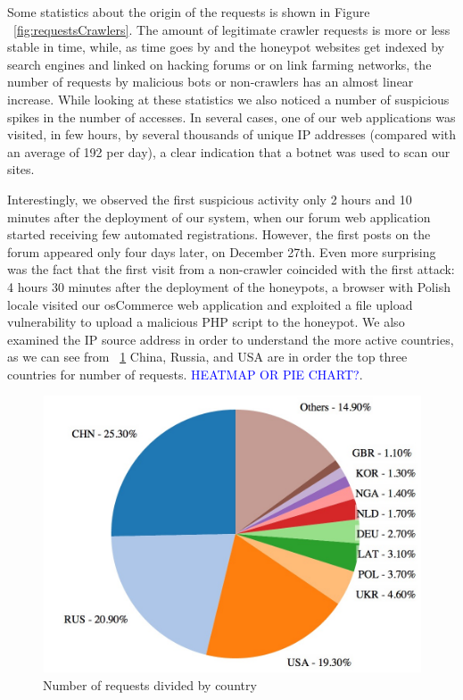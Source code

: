Some statistics about the origin of the requests is shown in Figure ~\ref{fig:requestsCrawlers}. The amount of legitimate crawler requests is more or less stable in time, while, as time goes by and the honeypot websites get indexed by search engines and linked on hacking forums or on link farming networks, the number of requests by malicious bots or non-crawlers has an almost linear increase.
While looking at these statistics we also noticed a number of suspicious spikes in the number of accesses. In several cases, one of our web applications was visited, in few hours, by several thousands of unique IP addresses (compared with an average of 192 per day), a clear indication that a botnet was used to scan our sites.

Interestingly, we observed the first suspicious activity only 2 hours and 10 minutes after the deployment of our system, when our forum web application started receiving few automated registrations. However, the first posts on the forum appeared only four days later, on December 27th. Even more surprising was the fact that the first visit from a non-crawler coincided with the first attack: 4 hours 30 minutes after the deployment of the honeypots, a browser with Polish locale visited our osCommerce web application and exploited a file upload vulnerability to upload a malicious PHP script to the honeypot. We also examined the IP source address in order to understand the more active countries, as we can see from ~\ref{fig:requests_countries} China, Russia, and USA are in order the top three countries for number of requests. \textcolor{blue}{HEATMAP OR PIE CHART?}.

\begin{figure}[tbh]
\centerline{\includegraphics[scale=0.5]{Images/requests_countries.jpg}}
\caption{Number of requests divided by country\label{fig:requests_countries}}
\end{figure}

